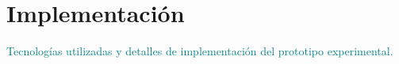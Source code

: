 \section{Implementación}
\textcolor{teal}{Tecnologías utilizadas y detalles de implementación del prototipo experimental.}
